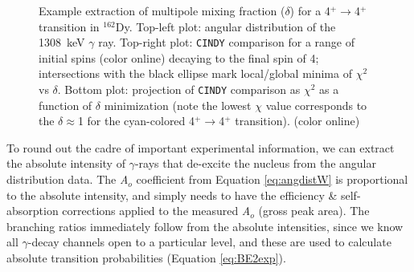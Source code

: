 \begin{figure}[ht]
\begin{center}
\caption{Example extraction of multipole mixing fraction ($\delta$) for a 4$^+\rightarrow$4$^+$ transition in $^{162}$Dy. Top-left plot: angular distribution of the 1308~keV $\gamma$ ray. Top-right plot: {\tt CINDY} comparison for a range of initial spins (color online) decaying to the final spin of 4; intersections with the black ellipse mark local/global minima of $\chi^2$ vs $\delta$. Bottom plot: projection of {\tt CINDY} comparison as $\chi^2$ as a function of $\delta$ minimization (note the lowest $\chi$ value corresponds to the $\delta\approx$1 for the cyan-colored 4$^+\rightarrow$4$^+$ transition). (color online) \label{fig:delta_mixing_example}}
\end{center}
\end{figure}

To round out the cadre of important experimental information, we can extract the absolute intensity of $\gamma$-rays that de-excite the nucleus from the angular distribution data. The \textit{A$_o$} coefficient from Equation \ref{eq:angdistW} is proportional to the absolute intensity, and simply needs to have the efficiency \& self-absorption corrections applied to the measured \textit{A$_o$} (gross peak area). The branching ratios immediately follow from the absolute intensities, since we know all $\gamma$-decay channels open to a particular level, and these are used to calculate absolute transition probabilities (Equation \ref{eq:BE2exp}).


